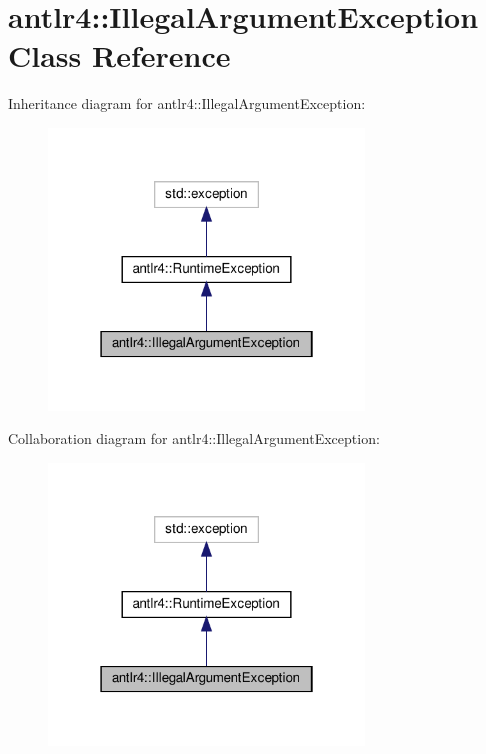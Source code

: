 \hypertarget{classantlr4_1_1IllegalArgumentException}{}\section{antlr4\+:\+:Illegal\+Argument\+Exception Class Reference}
\label{classantlr4_1_1IllegalArgumentException}


Inheritance diagram for antlr4\+:\+:Illegal\+Argument\+Exception\+:
\nopagebreak
\begin{figure}[H]
\begin{center}
\leavevmode
\includegraphics[width=238pt]{classantlr4_1_1IllegalArgumentException__inherit__graph}
\end{center}
\end{figure}


Collaboration diagram for antlr4\+:\+:Illegal\+Argument\+Exception\+:
\nopagebreak
\begin{figure}[H]
\begin{center}
\leavevmode
\includegraphics[width=238pt]{classantlr4_1_1IllegalArgumentException__coll__graph}
\end{center}
\end{figure}
